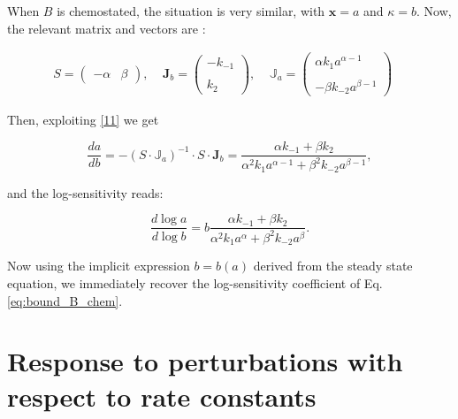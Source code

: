 \documentclass{article}
\begin{document}
	
	When $B$ is chemostated, the situation is very similar, with $\mathbf{x}=a$ and $\kappa = b$. Now, the relevant matrix and vectors are  :
	\begin{center}
		\begin{equation}
			\begin{aligned}
				S = \begin{pmatrix}
					-\alpha & \beta
				\end{pmatrix}, \ \ \ \ \
				\textbf{J}_b =  \begin{pmatrix}
					-k_{-1} \\ \\
					k_2
				\end{pmatrix}, \ \ \ \ \
				\mathbb{J}_{a} = \begin{pmatrix}
					\alpha k_1 a^{\alpha-1} \\ \\
					-\beta k_{-2} a^{\beta-1}
				\end{pmatrix} \ \ \ \ \
				\label{19}
			\end{aligned}
		\end{equation}
	\end{center}
	
	Then, exploiting \eqref{11} we get
	\begin{center}
		\begin{equation}
			\frac{d a}{d b} = - \left( S \cdot {\mathbb{J}}_{a} \right)^ {-1} \cdot S \cdot \mathbf{J}_{b} = \frac{\alpha k_{-1}+\beta k_2}{\alpha^2 k_1 a^{\alpha-1}+\beta^2 k_{-2} a^{\beta-1}},
		\end{equation}
	\end{center}
	and the log-sensitivity reads:
	\begin{center}
		\begin{equation}
			\frac{d \log a}{d \log b} = b \frac{\alpha k_{-1}+\beta k_2}{\alpha^2 k_1 a^{\alpha}+\beta^2 k_{-2} a^{\beta}}.
		\end{equation}
	\end{center}
	
	Now using the implicit expression $b=b(a)$ derived from the steady state equation, we immediately recover the log-sensitivity coefficient of Eq. \eqref{eq:bound_B_chem}.
	
	
	
	
	
	
	\section{Response to perturbations with respect to rate constants}
	
\end{document}
